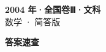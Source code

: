 \documentclass[zihao=-4, a4paper]{ctexart}
\begin{document}
\begin{center}
  {\Large\bfseries 2004 年·全国卷Ⅲ·文科}\\[4pt]
  {\large 数学 · 简答版}
\end{center}
\medskip
{}

\clearpage
{}
\begin{center}{\Large\bfseries 答案速查}\end{center}
\medskip

\end{document}

